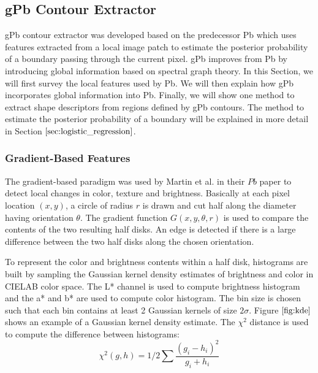 \documentclass{SMBV12}
\begin{document}
\subsection{gPb Contour Extractor}
\label{sec:shape_feature}

gPb contour extractor was developed based on the predecessor Pb which uses features extracted from a local
image patch to estimate the posterior probability of a boundary passing through the current pixel. gPb improves from Pb by introducing global information based on spectral graph theory. In this Section, we will first survey the local features used by Pb. We will then explain how gPb incorporates global information into Pb. Finally, we will show one method to extract shape descriptors from regions defined by gPb contours. The method to estimate the posterior probability of a boundary will be explained in more detail in Section $\ref{sec:logistic_regression}$.

\subsubsection{Gradient-Based Features}

The gradient-based paradigm was used by Martin et al. in their $Pb$ paper \cite{martin2004learning} to detect local changes in color, texture and brightness. Basically at each pixel location $(x, y)$, a circle of radius $r$ is drawn and cut half along the diameter having orientation $\theta$. The gradient function $G(x, y, \theta, r)$ is used to compare the contents of the two resulting half disks. An edge is detected if there is a large difference between the two half disks along the chosen orientation.

To represent the color and brightness contents within a half disk, histograms are built by sampling the Gaussian kernel density estimates of brightness and color in CIELAB color space. The L* channel is used to compute brightness histogram and the a* and b* are used to compute color histogram. The bin size is chosen such that each bin contains at least 2 Gaussian kernels of size $2\sigma$. Figure $\ref{fig:kde}$ shows an example of a Gaussian kernel density estimate. The $\chi^2$ distance is used to compute the difference between histograms:
\begin{equation}
	\chi^2(g, h) = 1/2\sum \dfrac{(g_i - h_i)^2}{g_i + h_i}
\end{equation}
\end{document}
